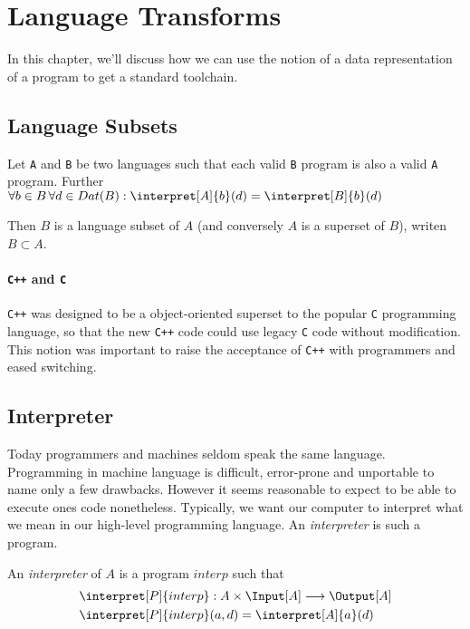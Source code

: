 \section{Language Transforms} %
\label{sec:transforms}
In this chapter, we'll discuss how we can use the notion of a data 
representation of a program to get a standard toolchain.
\subsection{Language Subsets} %
\label{sub:Language Subsets}
\begin{defn}
	Let {\tt A} and {\tt B} be two languages such that each valid {\tt B} 
	program is also a valid {\tt A} program. Further 
	$\forall b\in B\, \forall d\in Dat(B): \interpret[A]{b}(d) = \interpret[B]{b}(d)$

	Then $B$ is a language subset of $A$ (and conversely $A$ is a superset of
	$B$), writen $B \subset A$.
\end{defn}
\paragraph{{\tt C++}  and {\tt C} } %
\label{par:Cpp and C}
{\tt C++} was designed to be a object-oriented superset to the popular {\tt C}
programming language, so that the new {\tt C++} code could use legacy {\tt C}
code without modification. This notion was important to raise the acceptance of
{\tt C++} with programmers and eased switching.
\subsection{Interpreter} %
\label{sub:Interpreter}
Today programmers and machines seldom speak the same language. Programming in 
machine language is difficult, error-prone and unportable to name only a few 
drawbacks. However it seems reasonable to expect to be able to execute ones 
code nonetheless. Typically, we want our computer to interpret what we mean 
in our high-level programming language. An {\em interpreter} is such a program.

\begin{defn}
	An {\em interpreter} of $A$ is a program $interp$ such that
	\begin{equation*}
		\begin{split}
			\interpret[P]{interp}&: A \times \Input[A] \longrightarrow \Output[A] \\
			\interpret[P]{interp}&(a, d) = \interpret[A]{a}(d)
		\end{split}
	\end{equation*}
\end{defn}

